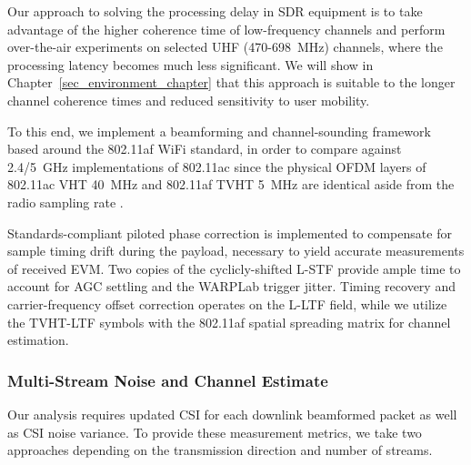 	Our approach to solving the processing delay in \ac{SDR} equipment is to take advantage of the higher coherence time of low-frequency channels and perform over-the-air experiments on selected UHF (470-698~MHz) channels, where the processing latency becomes much less significant.
	We will show in Chapter~\ref{sec_environment_chapter} that this approach is suitable to the longer channel coherence times and reduced sensitivity to user mobility.

	To this end, we implement a beamforming and channel-sounding framework based around the 802.11af WiFi standard, in order to compare against 2.4/5~GHz implementations of 802.11ac since the physical \ac{OFDM} layers of 802.11ac VHT 40~MHz and 802.11af TVHT 5~MHz are identical aside from the radio sampling rate \cite{std11af,std11ac} \cite{guerra2018toolbox}.
	
	Standards-compliant piloted phase correction is implemented to compensate for sample timing drift during the payload, necessary to yield accurate measurements of received \ac{EVM}.
	Two copies of the cyclicly-shifted L-STF provide ample time to account for AGC settling and the WARPLab trigger jitter.
	Timing recovery and carrier-frequency offset correction operates on the L-LTF field, while we utilize the TVHT-LTF symbols with the 802.11af spatial spreading matrix for channel estimation.
	

\subsubsection{Multi-Stream Noise and Channel Estimate}
\label{sec_static_mubf_chan_est}

	Our analysis requires updated \ac{CSI} for each downlink beamformed packet as well as \ac{CSI} noise variance.
	To provide these measurement metrics, we take two approaches depending on the transmission direction and number of streams.

